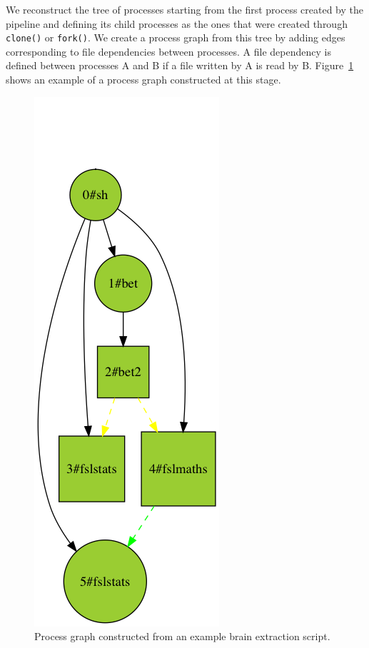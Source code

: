 \documentclass{article}
\begin{document}
We reconstruct the tree of processes starting from the first process
created by the pipeline and defining its child processes as the ones
that were created through \texttt{clone()} or \texttt{fork()}. We
create a process graph from this tree by adding edges corresponding to
file dependencies between processes. A file dependency is defined
between processes A and B if a file written by A is read by
B. Figure~\ref{fig:graph-example} shows an example of a process graph
constructed at this stage.

\begin{figure}
  \includegraphics[scale=0.3]{images/simple_graph}
  \caption{Process graph constructed from an example brain extraction script.}
  \label{fig:graph-example}
\end{figure}
\end{document}
